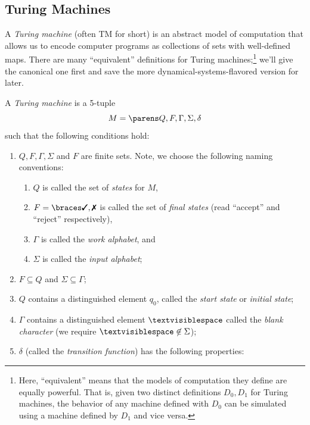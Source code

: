 \documentclass{fkpaper}
\newcommand{\blank}{\textvisiblespace}
\begin{document}
\begin{multicols}{2}
\subsection{Turing Machines}
A \emph{Turing machine} (often TM for short) is an abstract model of
computation that allows us to encode computer programs as collections
of sets with well-defined maps. There are many ``equivalent''
definitions for Turing machines;\footnote{Here, ``equivalent'' means
  that the models of computation they define are equally powerful.
  That is, given two distinct definitions $D_0, D_1$ for Turing
  machines, the behavior of any machine defined with $D_0$ can be
  simulated using a machine defined by $D_1$ and vice versa.} we'll
give the canonical one first and save the more
dynamical-systems-flavored version for later.
\begin{definition}
  A \emph{Turing machine} is a {\color{red} 5}-tuple
  \[
    M = \pn{Q, F, \Gamma, \Sigma, \delta}
  \]
  such that the following conditions hold:
  \begin{enumerate}[label=\arabic*)]
    \item $Q, F, \Gamma, \Sigma$ and $F$ are finite sets. Note, we
      choose the following naming conventions:
      \begin{enumerate}[label=\roman*)]
        \item $Q$ is called the set of \emph{states} for $M$,
        \item $F = \set{\cmark, \xmark}$ is called the set of
          \emph{final states} (read ``accept'' and ``reject''
          respectively),
        \item $\Gamma$ is called the \emph{work alphabet}, and
        \item $\Sigma$ is called the \emph{input alphabet};
      \end{enumerate}
    \item $F \subseteq Q$ and $\Sigma \subseteq \Gamma$;
    \item $Q$ contains a distinguished element $q_0$, called the
      \emph{start state} or \emph{initial state};
    \item $\Gamma$ contains a distinguished element $\blank$ called the
      \emph{blank character} (we require $\blank \not \in \Sigma$);
    \item $\delta$ (called the \emph{transition function}) has the
      following properties:
\end{enumerate}
\end{definition}
\end{multicols}
\end{document}
